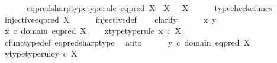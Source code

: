 \begin{isabellebody}
\isamarkupfalse%
\ {\isacharminus}{\kern0pt}\ \isanewline
\ \ \isamarkupfalse%
\ eq{\isacharunderscore}{\kern0pt}pred{\isacharunderscore}{\kern0pt}sharp{\isacharunderscore}{\kern0pt}type{\isacharbrackleft}{\kern0pt}type{\isacharunderscore}{\kern0pt}rule{\isacharbrackright}{\kern0pt}{\isacharcolon}{\kern0pt}\ {\isachardoublequoteopen}eq{\isacharunderscore}{\kern0pt}pred\ X\isactrlsup {\isasymsharp}\ {\isacharcolon}{\kern0pt}\ X\ {\isasymrightarrow}\ \ {\isasymOmega}\isactrlbsup X\isactrlesup {\isachardoublequoteclose}\isanewline
\ \ \ \ \isamarkupfalse%
\ typecheck{\isacharunderscore}{\kern0pt}cfuncs\isanewline
\ \ \isamarkupfalse%
\ {\isachardoublequoteopen}injective{\isacharparenleft}{\kern0pt}eq{\isacharunderscore}{\kern0pt}pred\ X\isactrlsup {\isasymsharp}{\isacharparenright}{\kern0pt}{\isachardoublequoteclose}\isanewline
\ \ \ \ \isamarkupfalse%
\ injective{\isacharunderscore}{\kern0pt}def\isanewline
\ \ \isamarkupfalse%
\ {\isacharparenleft}{\kern0pt}clarify{\isacharparenright}{\kern0pt}\isanewline
\ \ \ \ \isamarkupfalse%
\ x\ y\ \isanewline
\ \ \ \ \isamarkupfalse%
\ {\isachardoublequoteopen}x\ {\isasymin}\isactrlsub c\ domain\ {\isacharparenleft}{\kern0pt}eq{\isacharunderscore}{\kern0pt}pred\ X\isactrlsup {\isasymsharp}{\isacharparenright}{\kern0pt}{\isachardoublequoteclose}\ \isamarkupfalse%
\ \isamarkupfalse%
\ x{\isacharunderscore}{\kern0pt}type{\isacharbrackleft}{\kern0pt}type{\isacharunderscore}{\kern0pt}rule{\isacharbrackright}{\kern0pt}{\isacharcolon}{\kern0pt}\ {\isachardoublequoteopen}x\ {\isasymin}\isactrlsub c\ X{\isachardoublequoteclose}\isanewline
\ \ \ \ \ \ \isamarkupfalse%
\ cfunc{\isacharunderscore}{\kern0pt}type{\isacharunderscore}{\kern0pt}def\ eq{\isacharunderscore}{\kern0pt}pred{\isacharunderscore}{\kern0pt}sharp{\isacharunderscore}{\kern0pt}type\ \isamarkupfalse%
\ auto\isanewline
\ \ \ \ \isamarkupfalse%
\ {\isachardoublequoteopen}y\ {\isasymin}\isactrlsub c\ domain\ {\isacharparenleft}{\kern0pt}eq{\isacharunderscore}{\kern0pt}pred\ X\isactrlsup {\isasymsharp}{\isacharparenright}{\kern0pt}{\isachardoublequoteclose}\ \isamarkupfalse%
\ \isamarkupfalse%
\ y{\isacharunderscore}{\kern0pt}type{\isacharbrackleft}{\kern0pt}type{\isacharunderscore}{\kern0pt}rule{\isacharbrackright}{\kern0pt}{\isacharcolon}{\kern0pt}{\isachardoublequoteopen}y\ {\isasymin}\isactrlsub c\ X{\isachardoublequoteclose}\isanewline

\end{isabellebody}
